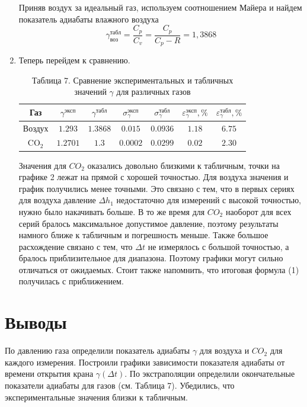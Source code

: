 \documentclass[a4paper]{article}
\begin{document}
\begin{enumerate}
Приняв воздух за идеальный газ, используем соотношением Майера и найдем показатель адиабаты влажного воздуха
\begin{equation*}
	\gamma_{\text{воз}}^{\text{табл}} = \frac{C_p}{C_v} = \frac{C_p}{C_p - R} = 1,3868
\end{equation*}
\item Теперь перейдем к сравнению.
\begin{table}[h!]
    \centering
    \begin{tabular}{|c|c|c|c|c|c|c|}
        \hline
        Газ & $\gamma^{\text{эксп}}$ & $\gamma^{\text{табл}}$ & $\sigma_{\gamma}^{\text{эксп}}$ & $\sigma_{\gamma}^{\text{табл}}$ & $\varepsilon_{\gamma}^{\text{эксп}}, \%$ & $\varepsilon_{\gamma}^{\text{табл}}, \%$ \\
        \hline
        Воздух & $1.293$ & $1.3868$ & $0.015$ & $0.0936$ & $1.18$ & $6.75$ \\ \hline
        CO$_2$ & $1.2701$ & $1.3$ & $0.0002$ & $0.0299$ & $0.02$ & $2.30$ \\ \hline
    \end{tabular}
    \caption{Таблица 7. Сравнение экспериментальных и табличных значений $\gamma$ для различных газов}
\end{table}
Значения для $CO_2$ оказались довольно близкими к табличным, точки на графике 2 лежат на прямой с хорошей точностью. Для воздуха значения и график получились менее точными. Это связано с тем, что в первых сериях для воздуха давление $\Delta h_1$ недостаточно для измерений с высокой точностью, нужно было накачивать больше. В то же время для $CO_2$ наоборот для всех серий бралось максимальное допустимое давление, поэтому результаты намного ближе к табличным и погрешность меньше. Также большое расхождение связано с тем, что $\Delta t$ не измерялось с большой точностью, а бралось приблизительное для диапазона. Поэтому графики могут сильно отличаться от ожидаемых. Стоит также напомнить, что итоговая формула (1) получилась с приближением.

\end{enumerate}

\section{Выводы}
По давлению газа определили показатель адиабаты $\gamma$ для воздуха и $CO_2$ для каждого измерения. Построили графики зависимости показателя адиабаты от времени открытия крана $\gamma(\Delta t)$. По экстраполяции определили окончательные показатели адиабаты для газов (см. Таблица 7). Убедились, что экспериментальные значения близки к табличным.
\end{document}

